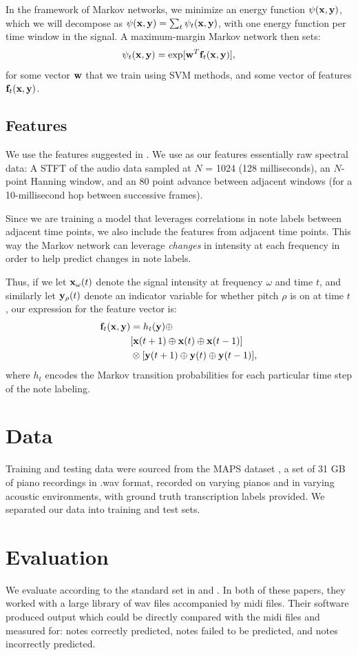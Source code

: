 \documentclass{article}
\begin{document}
In the framework of Markov networks, we minimize
an energy function $\psi(\mathbf{x},\mathbf{y})$, which we will decompose as
$\psi(\mathbf{x},\mathbf{y}) = \sum_t \psi_t(\mathbf{x},\mathbf{y})$, with one energy function per time window
in the signal. A maximum-margin Markov network then sets:
\[ \psi_t(\mathbf{x},\mathbf{y}) = \exp[\mathbf{w}^T\mathbf{f}_t(\mathbf{x},\mathbf{y})], \]
for some vector $\mathbf{w}$ that we train using SVM methods, and some vector of
features $\mathbf{f}_t(\mathbf{x},\mathbf{y})$.

\subsection{Features}
We use the features suggested in \cite{poliner2006discriminative}.
We use as our features essentially raw spectral data:
A STFT of the audio data sampled at $N$ = 1024 (128 milliseconds), an $N$-point Hanning window, and an 80 point advance between adjacent windows (for a 10-millisecond hop between successive frames).

Since we are training a model that leverages correlations in note labels
between adjacent time points, we also include the features from adjacent
time points. This way the Markov network can leverage \emph{changes} in
intensity at each frequency in order to help predict changes in note labels.

Thus, if we let $\mathbf{x}_{\omega}(t)$ denote the signal intensity at frequency
$\omega$ and time $t$, and similarly let $\mathbf{y}_{\rho}(t)$ denote an indicator
variable for whether pitch $\rho$ is on at time $t$, our expression for the
feature vector is:
\begin{align*}
  \mathbf{f}_t(\mathbf{x},\mathbf{y}) &= h_t(\mathbf{y}) \oplus
      \\& [\mathbf{x}(t+1) \oplus \mathbf{x}(t) \oplus \mathbf{x}(t-1)]
      \\&\otimes [\mathbf{y}(t+1) \oplus \mathbf{y}(t) \oplus \mathbf{y}(t-1)],
\end{align*}
where $h_t$ encodes the Markov transition probabilities for each particular
time step of the note labeling.

\section{Data}
Training and testing data were sourced from the MAPS dataset 
\cite{emiya2010multipitch}, a set of 31 GB of piano recordings in .wav format,
recorded on varying pianos and in varying acoustic environments, with ground
truth transcription labels provided. We separated our data into training and test sets.

\section{Evaluation}
We evaluate according to the standard set in \cite{poliner2006discriminative} and \cite{bock2012polyphonic}.
In both of these papers, they worked with a large library of wav files accompanied by midi files. Their software produced
output which could be directly compared with the midi files and measured for: notes correctly predicted, notes failed to be predicted, and notes incorrectly predicted.
\end{document}
